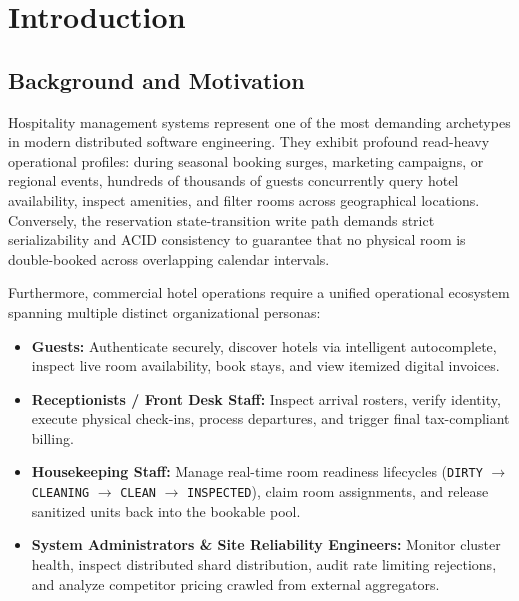 \documentclass[11pt,a4paper]{article}
\begin{document}
\vspace{1cm}
\tableofcontents
\newpage
\listoffigures
\listoftables
\newpage
{}

\section{Introduction}

\subsection{Background and Motivation}
Hospitality management systems represent one of the most demanding archetypes in modern distributed software engineering. They exhibit profound read-heavy operational profiles: during seasonal booking surges, marketing campaigns, or regional events, hundreds of thousands of guests concurrently query hotel availability, inspect amenities, and filter rooms across geographical locations. Conversely, the reservation state-transition write path demands strict serializability and ACID consistency to guarantee that no physical room is double-booked across overlapping calendar intervals.

Furthermore, commercial hotel operations require a unified operational ecosystem spanning multiple distinct organizational personas:
\begin{itemize}
    \item \textbf{Guests:} Authenticate securely, discover hotels via intelligent autocomplete, inspect live room availability, book stays, and view itemized digital invoices.
    \item \textbf{Receptionists / Front Desk Staff:} Inspect arrival rosters, verify identity, execute physical check-ins, process departures, and trigger final tax-compliant billing.
    \item \textbf{Housekeeping Staff:} Manage real-time room readiness lifecycles (\texttt{DIRTY} $\to$ \texttt{CLEANING} $\to$ \texttt{CLEAN} $\to$ \texttt{INSPECTED}), claim room assignments, and release sanitized units back into the bookable pool.
    \item \textbf{System Administrators \& Site Reliability Engineers:} Monitor cluster health, inspect distributed shard distribution, audit rate limiting rejections, and analyze competitor pricing crawled from external aggregators.
\end{itemize}
\end{document}
